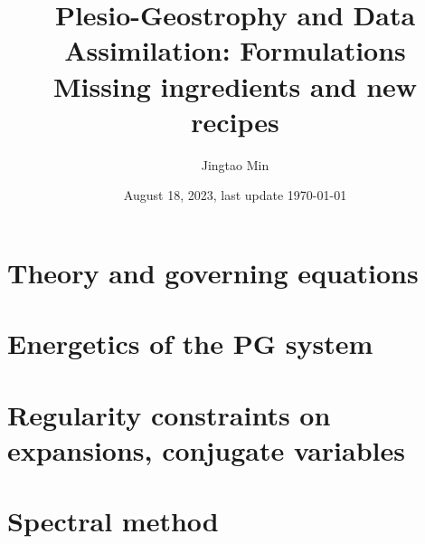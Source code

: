 \documentclass[a4paper, 11pt]{report}
\title{Plesio-Geostrophy and Data Assimilation: Formulations \\ {\Large Missing ingredients and new recipes}}
\author{Jingtao Min}
\date{August 18, 2023, last update \today}
\begin{document}
\maketitle


\chapter{Theory and governing equations}




















\chapter{Energetics of the PG system}












\chapter{Regularity constraints on expansions, conjugate variables}
\label{chap:regularity}








\chapter{Spectral method}


\end{document}
